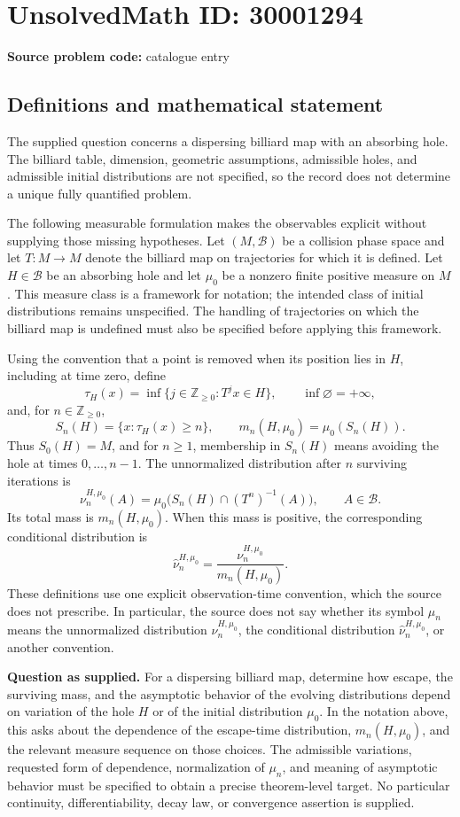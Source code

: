 \documentclass[11pt]{article}
\newcommand{\Z}{\mathbb{Z}}
\begin{document}
\section*{UnsolvedMath ID: 30001294}
\textbf{Source problem code:} catalogue entry
\subsection{Definitions and mathematical statement}
The supplied question concerns a dispersing billiard map with an absorbing hole. The billiard table, dimension, geometric assumptions, admissible holes, and admissible initial distributions are not specified, so the record does not determine a unique fully quantified problem.

The following measurable formulation makes the observables explicit without supplying those missing hypotheses. Let \((M,\mathcal B)\) be a collision phase space and let \(T\colon M\to M\) denote the billiard map on trajectories for which it is defined. Let \(H\in\mathcal B\) be an absorbing hole and let \(\mu_0\) be a nonzero finite positive measure on \(M\). This measure class is a framework for notation; the intended class of initial distributions remains unspecified. The handling of trajectories on which the billiard map is undefined must also be specified before applying this framework.

Using the convention that a point is removed when its position lies in \(H\), including at time zero, define
\[
\tau_H(x)=\inf\{j\in\Z_{\geq 0}:T^j x\in H\},
\qquad \inf\varnothing=+\infty,
\]
and, for \(n\in\Z_{\geq 0}\),
\[
S_n(H)=\{x:\tau_H(x)\geq n\},
\qquad
m_n(H,\mu_0)=\mu_0(S_n(H)).
\]
Thus \(S_0(H)=M\), and for \(n\geq1\), membership in \(S_n(H)\) means avoiding the hole at times \(0,\ldots,n-1\). The unnormalized distribution after \(n\) surviving iterations is
\[
\nu_n^{H,\mu_0}(A)
=\mu_0\bigl(S_n(H)\cap(T^n)^{-1}(A)\bigr),
\qquad A\in\mathcal B.
\]
Its total mass is \(m_n(H,\mu_0)\). When this mass is positive, the corresponding conditional distribution is
\[
\widehat\nu_n^{H,\mu_0}
=\frac{\nu_n^{H,\mu_0}}{m_n(H,\mu_0)}.
\]
These definitions use one explicit observation-time convention, which the source does not prescribe. In particular, the source does not say whether its symbol \(\mu_n\) means the unnormalized distribution \(\nu_n^{H,\mu_0}\), the conditional distribution \(\widehat\nu_n^{H,\mu_0}\), or another convention.

\textbf{Question as supplied.} For a dispersing billiard map, determine how escape, the surviving mass, and the asymptotic behavior of the evolving distributions depend on variation of the hole \(H\) or of the initial distribution \(\mu_0\). In the notation above, this asks about the dependence of the escape-time distribution, \(m_n(H,\mu_0)\), and the relevant measure sequence on those choices. The admissible variations, requested form of dependence, normalization of \(\mu_n\), and meaning of asymptotic behavior must be specified to obtain a precise theorem-level target. No particular continuity, differentiability, decay law, or convergence assertion is supplied.
\end{document}
